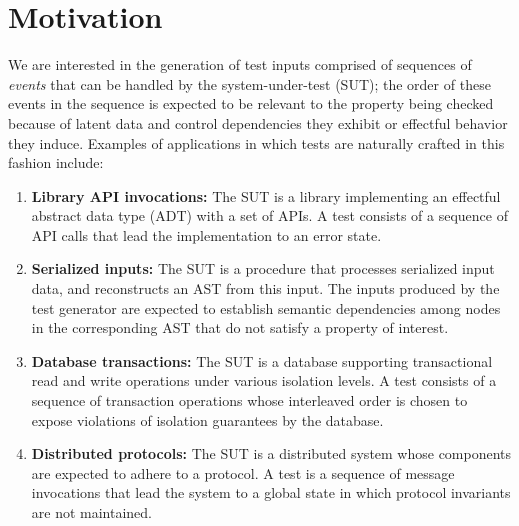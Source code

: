 \section{Motivation}
\label{sec:pret}

We are interested in the generation of test inputs comprised of
sequences of \emph{events} that can be handled by the
system-under-test (SUT); the order of these events in the sequence is
expected to be relevant to the property being checked because of
latent data and control dependencies they exhibit or effectful
behavior they induce.  Examples of applications in which tests are
naturally crafted in this fashion include:
\begin{enumerate}

\item \textbf{Library API invocations:} The SUT is a library
  implementing an effectful abstract data type (ADT) with a set of
  APIs.  A test consists of a sequence of API calls that lead the
  implementation to an error state.

\item \textbf{Serialized inputs:} The SUT is a procedure that processes
  serialized input data, and reconstructs an AST from this input.  The
  inputs produced by the test generator are expected to establish
  semantic dependencies among nodes in the corresponding AST that do
  not satisfy a property of interest.

\item \textbf{Database transactions:} The SUT is a database supporting
  transactional read and write operations under various isolation
  levels.  A test consists of a sequence of transaction operations
  whose interleaved order is chosen to expose violations of isolation
  guarantees by the database.

\item \textbf{Distributed protocols:} The SUT is a distributed system
  whose components are expected to adhere to a protocol.  A test is a
  sequence of message invocations that lead the system to a global
  state in which protocol invariants are not maintained.
\end{enumerate}

